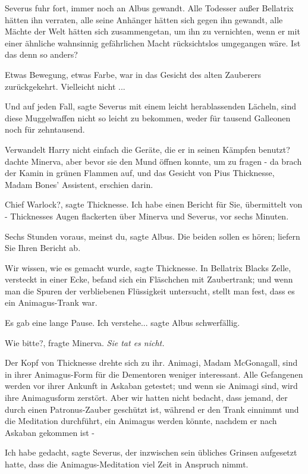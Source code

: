Severus fuhr fort, immer noch an Albus gewandt. \glqq Alle Todesser außer
Bellatrix hätten ihn verraten, alle seine Anhänger hätten sich gegen ihn
gewandt, alle Mächte der Welt hätten sich zusammengetan, um ihn zu vernichten,
wenn er mit einer ähnliche wahnsinnig gefährlichen Macht rücksichtslos
umgegangen wäre. Ist das denn so anders?\grqq{}

Etwas Bewegung, etwas Farbe, war in das Gesicht des alten Zauberers
zurückgekehrt. \glqq Vielleicht nicht ...\grqq{}

\glqq Und auf jeden Fall\grqq{}, sagte Severus mit einem leicht herablassenden
Lächeln, \glqq sind diese Muggelwaffen nicht so leicht zu bekommen, weder für
tausend Galleonen noch für zehntausend.\grqq{}

Verwandelt Harry nicht einfach die Geräte, die er in seinen Kämpfen benutzt?
dachte Minerva, aber bevor sie den Mund öffnen konnte, um zu fragen - da brach
der Kamin in grünen Flammen auf, und das Gesicht von Pius Thicknesse, Madam
Bones' Assistent, erschien darin.

\glqq Chief Warlock?\grqq{}, sagte Thicknesse. \glqq Ich habe einen Bericht für
Sie, übermittelt von -\grqq{} Thicknesses Augen flackerten über Minerva und
Severus, \glqq vor sechs Minuten\grqq{}.

\glqq Sechs Stunden voraus, meinst du\grqq{}, sagte Albus. \glqq Die beiden
sollen es hören; liefern Sie Ihren Bericht ab.\grqq{}

\glqq Wir wissen, wie es gemacht wurde\grqq{}, sagte Thicknesse. \glqq In
Bellatrix Blacks Zelle, versteckt in einer Ecke, befand sich ein Fläschchen mit
Zaubertrank; und wenn man die Spuren der verbliebenen Flüssigkeit untersucht,
stellt man fest, dass es ein Animagus-Trank war.\grqq{}

Es gab eine lange Pause. \glqq Ich verstehe...\grqq{} sagte Albus schwerfällig.

\glqq Wie bitte?\grqq{}, fragte Minerva. \emph{Sie tat es nicht.}

Der Kopf von Thicknesse drehte sich zu ihr. \glqq Animagi, Madam McGonagall,
sind in ihrer Animagus-Form für die Dementoren weniger interessant. Alle
Gefangenen werden vor ihrer Ankunft in Askaban getestet; und wenn sie Animagi
sind, wird ihre Animagusform zerstört. Aber wir hatten nicht bedacht, dass
jemand, der durch einen Patronus-Zauber geschützt ist, während er den Trank
einnimmt und die Meditation durchführt, ein Animagus werden könnte, nachdem er
nach Askaban gekommen ist -\grqq{}

\glqq Ich habe gedacht\grqq{}, sagte Severus, der inzwischen sein übliches
Grinsen aufgesetzt hatte, \glqq dass die Animagus-Meditation viel Zeit in
Anspruch nimmt.\grqq{}

